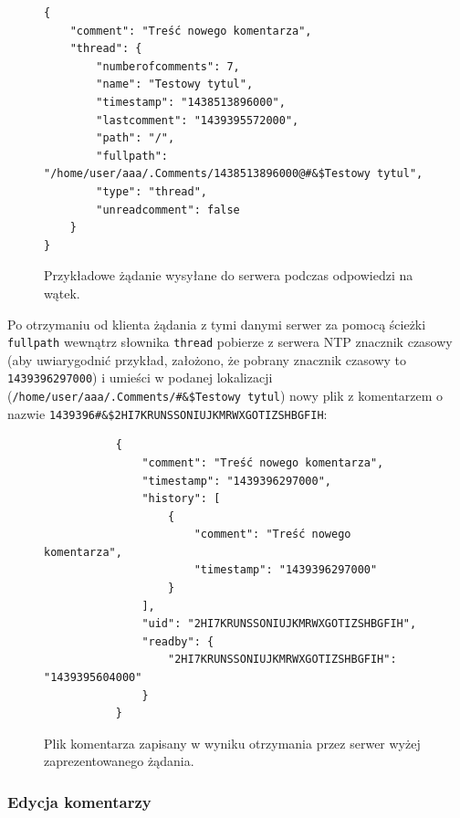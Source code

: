 \begin{figure}[htb!]
\label{newcommentrequest}
  \begin{verbatim}
{
    "comment": "Treść nowego komentarza", 
    "thread": {
        "numberofcomments": 7, 
        "name": "Testowy tytul", 
        "timestamp": "1438513896000", 
        "lastcomment": "1439395572000", 
        "path": "/", 
        "fullpath": "/home/user/aaa/.Comments/1438513896000@#&$Testowy tytul", 
        "type": "thread", 
        "unreadcomment": false
    }
}
  \end{verbatim}
  \caption{Przykładowe żądanie wysyłane do serwera podczas odpowiedzi na wątek.}
\end{figure}

Po otrzymaniu od klienta żądania z tymi danymi serwer za pomocą ścieżki \texttt{fullpath} wewnątrz słownika \texttt{thread} pobierze z serwera NTP znacznik czasowy (aby uwiarygodnić przykład, założono, że pobrany znacznik czasowy to \texttt{1439396297000}) i umieści w podanej lokalizacji (\texttt{/home/\-user/\-aaa/\-.Comments/\@\#\&\$Testowy tytul}) nowy plik z komentarzem o nazwie \texttt{1439396\@\#\&\$2HI7KRUNS\-SONIUJKM\-RWXGOTIZ\-SHBGFIH}:

\begin{figure}[htb]
\begin{verbatim}
           {
               "comment": "Treść nowego komentarza",
               "timestamp": "1439396297000",
               "history": [
                   {
                       "comment": "Treść nowego komentarza",
                       "timestamp": "1439396297000"
                   }
               ], 
               "uid": "2HI7KRUNSSONIUJKMRWXGOTIZSHBGFIH",
               "readby": {
                   "2HI7KRUNSSONIUJKMRWXGOTIZSHBGFIH": "1439395604000"
               }
           }
\end{verbatim}
  \caption{Plik komentarza zapisany w wyniku otrzymania przez serwer  wyżej zaprezentowanego żądania.}
\end{figure}

\subsubsection*{Edycja komentarzy}

